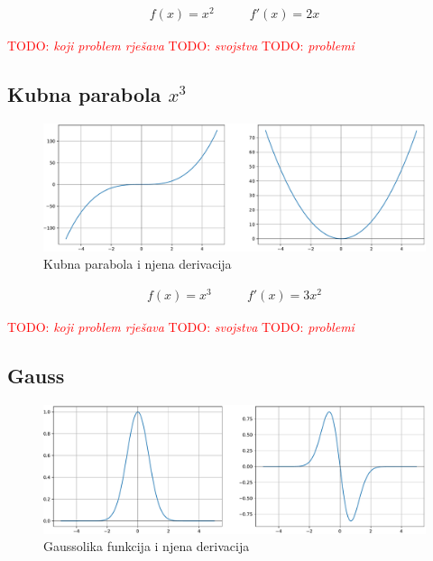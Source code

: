 \documentclass[times, utf8, diplomski]{fer}
\def\TODO#1{\noindent\textcolor{red}{TODO: \textit{#1}}\newline}
\def\todo#1{\TODO{#1}}
\begin{document}
\begin{equation}
\begin{split}
f(x) = x^2
\end{split}
\qquad
\begin{split}
f'(x) = 2x
\end{split}
\end{equation}

\todo{koji problem rješava}
\todo{svojstva}
\todo{problemi}

\subsection{Kubna parabola $x^3$}

\begin{figure}[H]
\includegraphics[width=\textwidth]{Pow3.pdf}
\centering
\caption{Kubna parabola i njena derivacija}
\label{fig:pow3}
\end{figure}

\begin{equation}
\begin{split}
f(x) = x^3
\end{split}
\qquad
\begin{split}
f'(x) = 3x^2
\end{split}
\end{equation}

\todo{koji problem rješava}
\todo{svojstva}
\todo{problemi}

\subsection{Gauss}

\begin{figure}[H]
\includegraphics[width=\textwidth]{Gauss.pdf}
\centering
\caption{Gaussolika funkcija i njena derivacija}
\label{fig:gauss}
\end{figure}
\end{document}
